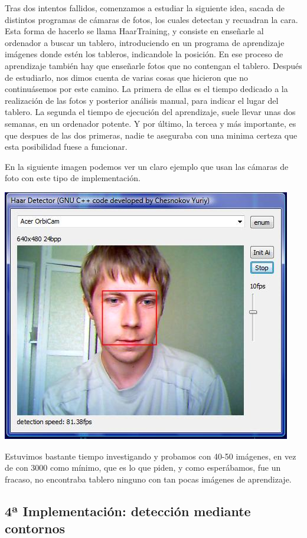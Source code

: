 \documentclass[12pt,a4papert,woside,openright,titlepage,final]{book}
\begin{document}
Tras dos intentos fallidos, comenzamos a estudiar la siguiente idea, sacada de
distintos programas de cámaras de fotos, los cuales detectan y recuadran la
cara. Esta forma de hacerlo se llama HaarTraining, y consiste en enseñarle al
ordenador a buscar un tablero, introduciendo en un programa de aprendizaje
imágenes donde estén los tableros, indicandole la posición. En ese proceso de
aprendizaje también hay que enseñarle fotos que no contengan el tablero.
Después de estudiarlo, nos dimos cuenta de varias cosas que hicieron que no
continuásemos por este camino. La primera de ellas es el tiempo dedicado a la
realización de las fotos y posterior análisis manual, para indicar el lugar del
tablero. La segunda el tiempo de ejecución del aprendizaje, suele llevar unas
dos semanas, en un ordenador potente. Y por último, la tercea y más importante,
es que despues de las dos primeras, nadie te aseguraba con una minima certeza 
que esta posibilidad fuese a funcionar.

En la siguiente imagen podemos ver un claro ejemplo que usan las cámaras de foto
con este tipo de implementación.

\includegraphics[scale=1]{haartraining.jpg} 

Estuvimos bastante tiempo investigando y probamos con 40-50 imágenes, en vez de
con 3000 como mínimo, que es lo que piden, y como esperábamos, fue un fracaso,
no encontraba tablero ninguno con tan pocas imágenes de aprendizaje. 


\subsection{4ª Implementación: detección mediante contornos}
\end{document}
